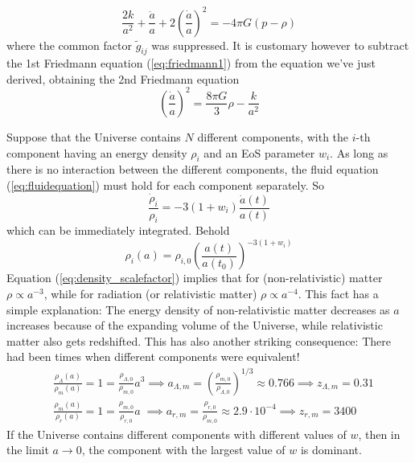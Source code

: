 \begin{equation}
    \frac{2k}{a^{2}} + \frac{\ddot{a}}{a} +2\left(\frac{\dot{a}}{a}\right)^{2} = -4\pi G(p-\rho)
\end{equation}
where the common factor $\tilde{g}_{ij}$ was suppressed. It is customary however to subtract the 1st Friedmann equation (\ref{eq:friedmann1}) from the equation we've just derived, obtaining the 2nd Friedmann equation
\begin{equation}
    \boxed{
    \left(\frac{\dot{a}}{a}\right)^{2} = \frac{8\pi G}{3}\rho -\frac{k}{a^{2}}
    }
    \label{eq:friedmann2}
\end{equation}
\par Suppose that the Universe contains $N$ different components, with the $i$-th component having an energy density $\rho_{i}$ and an EoS parameter $w_{i}$. As long as there is no interaction between the different components, the fluid equation (\ref{eq:fluidequation}) must hold for each component separately. So
\begin{equation}
    \frac{\dot{\rho}_{i}}{\rho_{i}} = -3(1+w_{i})\frac{\dot{a}(t)}{a(t)}
\end{equation}
which can be immediately integrated. Behold
\begin{equation}
    \boxed{
    \rho_{i}(a) = \rho_{i,0}\left(\frac{a(t)}{a(t_{0})}\right)^{-3(1+w_{i})}
    }
    \label{eq:density_scalefactor}
\end{equation}
Equation (\ref{eq:density_scalefactor}) implies that for (non-relativistic) matter $\rho \propto a^{-3}$, while for radiation (or relativistic matter) $\rho\propto a^{-4}$. This fact has a simple explanation: The energy density of non-relativistic matter decreases as $a$ increases because of the expanding volume of the Universe, while relativistic matter also gets redshifted. This has also another striking consequence: There had been times when different components were equivalent!
\begin{align*}
    & \frac{\rho_{\Lambda}(a)}{\rho_{m}(a)}=1=\frac{\rho_{\Lambda,0}}{\rho_{m,0}}a^{3} \implies a_{\Lambda,m} = \left(\frac{\rho_{m,0}}{\rho_{\Lambda,0}}\right)^{1/3} \approx 0.766 \implies z_{\Lambda,m}= 0.31\\
    & \frac{\rho_{m}(a)}{\rho_{r}(a)}=1=\frac{\rho_{m,0}}{\rho_{r,0}}a \; \implies a_{r,m} = \frac{\rho_{r,0}}{\rho_{m,0}} \approx 2.9\cdot 10^{-4} \implies z_{r,m}= 3400
\end{align*}
If the Universe contains different components with different values of $w$, then in the limit $a\to 0$, the component with the largest value of $w$ is dominant.
